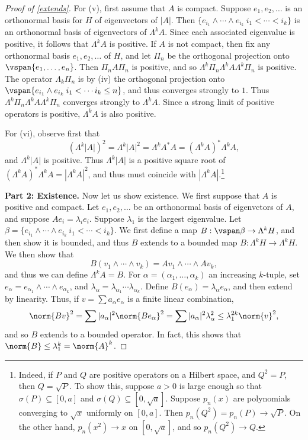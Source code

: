 \documentclass[12pt]{amsart}
\begin{document}
\begin{proof}[Proof of \cref{extends}]
For (v), first assume that $A$ is compact. Suppose $e_1,e_2,\ldots$ is an orthonormal basis for $H$ of eigenvectors of $|A|$. Then $\{e_{i_1}\wedge \cdots \wedge e_{i_k}\: i_1 < \cdots < i_k\}$ is an orthonormal basis of eigenvectors of $\Lambda^k A$. Since each associated eigenvalue is positive, it follows that $\Lambda^k A$ is positive. If $A$ is not compact, then fix any orthonormal basis $e_1,e_2,\ldots$ of $H$, and let $\Pi_n$ be the orthogonal projection onto $\vspan\{e_1,\ldots,e_n\}$. Then $\Pi_nA\Pi_n$ is positive, and so $\Lambda^k \Pi_n \Lambda^k A \Lambda^k \Pi_n$ is positive. The operator $\Lambda_k \Pi_n$ is by (iv) the orthogonal projection onto $\vspan\{e_{i_1}\wedge e_{i_k}\: i_1 < \cdots i_k \leq n\}$, and thus converges strongly to $1$. Thus $\Lambda^k \Pi_n \Lambda^k A \Lambda^k \Pi_n$ converges strongly to $\Lambda^k A$. Since a strong limit of positive operators is positive, $\Lambda^k A$ is also positive.

For (vi), observe first that
\[(\Lambda^k |A|)^2 = \Lambda^k |A|^2 = \Lambda^k A^\ast A = (\Lambda^k A)^\ast\Lambda^k A,\] and $\Lambda^k |A|$ is positive. Thus $\Lambda^k |A|$ is a positive square root of $(\Lambda^k A)^\ast\Lambda^k A = |\Lambda^k A|^2$, and thus must coincide with $|\Lambda^k A|$.\footnote{Indeed, if $P$ and $Q$ are positive operators on a Hilbert space, and $Q^2 = P$, then $Q = \sqrt{P}$. To show this, suppose $a > 0$ is large enough so that $\sigma(P) \subseteq [0,a]$ and $\sigma(Q) \subseteq [0,\sqrt{a}]$. Suppose $p_n(x)$ are polynomials converging to $\sqrt{x}$ uniformly on $[0,a]$. Then $p_n(Q^2) = p_n(P) \to \sqrt{P}$. On the other hand, $p_n(x^2) \to x$ on $[0,\sqrt{a}]$, and so $p_n(Q^2) \to Q$.}


\textbf{Part 2: Existence.} Now let us show existence. We first suppose that $A$ is positive and compact. Let $e_1,e_2,\ldots$ be an orthonormal basis of eigenvctors of $A$, and suppose $Ae_i = \lambda_i e_i$. Suppose $\lambda_1$ is the largest eigenvalue. Let $\beta = \{e_{i_1}\wedge \cdots \wedge e_{i_k}\: i_1 < \cdots < i_k\}$. We first define a map $B:\vspan \beta \to \Lambda^k H$, and then show it is bounded, and thus $B$ extends to a bounded map $B:\Lambda^k H \to \Lambda^k H$. We then show that \[B(v_1\wedge \cdots \wedge v_k) = Av_1 \wedge \cdots \wedge Av_k,\] and thus we can define $\Lambda^k A = B$. For $\alpha = (\alpha_1,\ldots,\alpha_k)$ an increasing $k$-tuple, set $e_\alpha = e_{\alpha_1} \wedge \cdots \wedge e_{\alpha_k}$, and $\lambda_\alpha = \lambda_{\alpha_1}\cdots\lambda_{\alpha_k}$. Define $B(e_\alpha) = \lambda_\alpha e_\alpha$, and then extend by linearity. Thus, if $v = \sum a_\alpha e_\alpha$ is a finite linear combination,
\[\norm{Bv}^2 = \sum |a_\alpha|^2\norm{Be_\alpha}^2 = \sum |a_\alpha|^2 \lambda_\alpha^2 \leq \lambda_1^{2k}\norm{v}^2,\] and so $B$ extends to a bounded operator. In fact, this shows that $\norm{B} \leq \lambda_1^k = \norm{A}^k$.


\end{proof}
\end{document}
